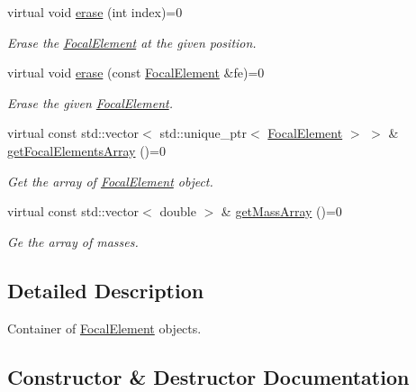 \begin{DoxyCompactItemize}
virtual void \hyperlink{classFocalElementContainer_aaf91ad85eeb5b218171a142d7c3e1116}{erase} (int index)=0
\begin{DoxyCompactList}\small\item\em Erase the \hyperlink{classFocalElement}{Focal\+Element} at the given position. \end{DoxyCompactList}\item 
virtual void \hyperlink{classFocalElementContainer_af20780adab46a8d4e5b42c8b1934ea86}{erase} (const \hyperlink{classFocalElement}{Focal\+Element} \&fe)=0
\begin{DoxyCompactList}\small\item\em Erase the given \hyperlink{classFocalElement}{Focal\+Element}. \end{DoxyCompactList}\item 
virtual const std\+::vector$<$ std\+::unique\+\_\+ptr$<$ \hyperlink{classFocalElement}{Focal\+Element} $>$ $>$ \& \hyperlink{classFocalElementContainer_aa06ed4c0c21777cdc5256b576dc5e718}{get\+Focal\+Elements\+Array} ()=0
\begin{DoxyCompactList}\small\item\em Get the array of \hyperlink{classFocalElement}{Focal\+Element} object. \end{DoxyCompactList}\item 
virtual const std\+::vector$<$ double $>$ \& \hyperlink{classFocalElementContainer_a9197229964bfdf8765f81bf7b85c669d}{get\+Mass\+Array} ()=0
\begin{DoxyCompactList}\small\item\em Ge the array of masses. \end{DoxyCompactList}\end{DoxyCompactItemize}


\subsection{Detailed Description}
Container of \hyperlink{classFocalElement}{Focal\+Element} objects. 

\subsection{Constructor \& Destructor Documentation}
\hypertarget{classFocalElementContainer_a939ab96df66f872bf1600e9536c15aaf}{}
